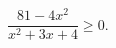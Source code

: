 \begin{ex}[type=inequality]
	\begin{condition}
		$ \dfrac{81 - 4x^2}{x^2 + 3x + 4}\geqslant0 . $
	\end{condition}
\end{ex}